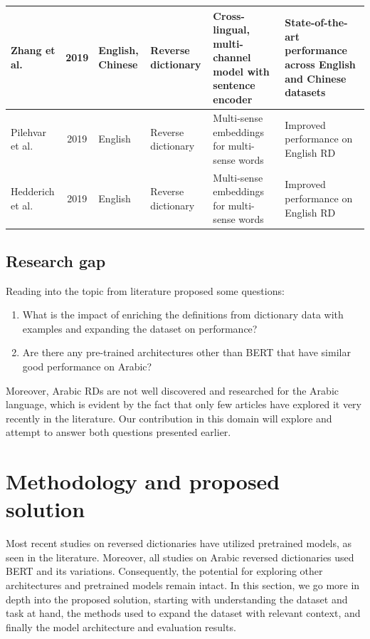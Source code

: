 \documentclass[15pt]{article}
\begin{document}
\begin{table}
\begin{tabularx}{\textwidth}{|l|c|X|X|X|X|}
        \hline
        Zhang et al. \cite{Zhang2019} & 2019 & English, Chinese & Reverse dictionary & Cross-lingual, multi-channel model with sentence encoder & State-of-the-art performance across English and Chinese datasets \\
        \hline
        Pilehvar et al. \cite{Pilehvar2019} & 2019 & English & Reverse dictionary & Multi-sense embeddings for multi-sense words & Improved performance on English RD \\
        \hline
        Hedderich et al. \cite{Hedderich2019} & 2019 & English & Reverse dictionary & Multi-sense embeddings for multi-sense words & Improved performance on English RD \\
        \hline
    \end{tabularx}
\end{table}

\subsection{Research gap}

Reading into the topic from literature proposed some questions:
\begin{enumerate}
    \item What is the impact of enriching the definitions from dictionary data with examples and expanding the dataset on performance?
    \item Are there any pre-trained architectures other than BERT that have similar good performance on Arabic?
\end{enumerate}

Moreover, Arabic RDs are not well discovered and researched for the Arabic language, which is evident by the fact that only few articles have explored it very recently in the literature. Our contribution in this domain will explore and attempt to answer both questions presented earlier.

\newpage

\section{Methodology and proposed solution}

Most recent studies on reversed dictionaries have utilized pretrained models, as seen in the literature. Moreover, all studies on Arabic reversed dictionaries used BERT and its variations. Consequently, the potential for exploring other architectures and pretrained models remain intact. 
In this section, we go more in depth into the proposed solution, starting with understanding the dataset and task at hand, the methods used to expand the dataset with relevant context, and finally the model architecture and evaluation results.
\end{document}
